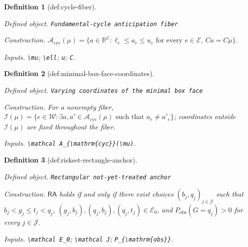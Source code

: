 \documentclass{article}
\newtheorem{definition}{Definition}
\begin{document}
\begin{definition}[def:cycle-fiber]\label{def:cycle-fiber}
\par\smallskip\noindent\emph{Defined object.} \texttt{Fundamental-\allowbreak{}cycle anticipation fiber}
\par\smallskip\noindent\emph{Construction.} \(\mathcal A_{\mathrm{cyc}}(\mu)=\{a\in\mathbb R^{\mathcal E}:\ell_e\le a_e\le u_e\text{ for every }e\in\mathcal E,\ Ca=C\mu\}\).
\par\smallskip\noindent\emph{Inputs.} \texttt{\textbackslash{}\allowbreak{}mu}; \texttt{\textbackslash{}\allowbreak{}ell}; \texttt{u}; \texttt{C}.
\end{definition}

\begin{definition}[def:minimal-box-face-coordinates]\label{def:minimal-box-face-coordinates}
\par\smallskip\noindent\emph{Defined object.} \texttt{Varying coordinates of the minimal box face}
\par\smallskip\noindent\emph{Construction.} For a nonempty fiber, \(\mathcal I(\mu)=\{e\in\mathcal W:\exists a,a'\in\mathcal A_{\mathrm{cyc}}(\mu)\text{ such that }a_e\ne a'_e\}\); coordinates outside \(\mathcal I(\mu)\) are fixed throughout the fiber.
\par\smallskip\noindent\emph{Inputs.} \texttt{\textbackslash{}\allowbreak{}mathcal A\_\allowbreak{}\{\textbackslash{}\allowbreak{}mathrm\{cyc\}\allowbreak{}\}\allowbreak{}(\textbackslash{}\allowbreak{}mu)}.
\end{definition}

\begin{definition}[def:riskset-rectangle-anchor]\label{def:riskset-rectangle-anchor}
\par\smallskip\noindent\emph{Defined object.} \texttt{Rectangular not-\allowbreak{}yet-\allowbreak{}treated anchor}
\par\smallskip\noindent\emph{Construction.} \(\mathsf{RA}\) holds if and only if there exist choices \((b_j,q_j)_{j\in\mathcal J}\) such that \(b_j<g_j\le t_j<q_j\), \((g_j,b_j),(q_j,b_j),(q_j,t_j)\in\mathcal E_0\), and \(P_{\mathrm{obs}}(G=q_j)>0\) for every \(j\in\mathcal J\).
\par\smallskip\noindent\emph{Inputs.} \texttt{\textbackslash{}\allowbreak{}mathcal E\_\allowbreak{}0}; \texttt{\textbackslash{}\allowbreak{}mathcal J}; \texttt{P\_\allowbreak{}\{\textbackslash{}\allowbreak{}mathrm\{obs\}\allowbreak{}\}\allowbreak{}}.
\end{definition}
\end{document}
